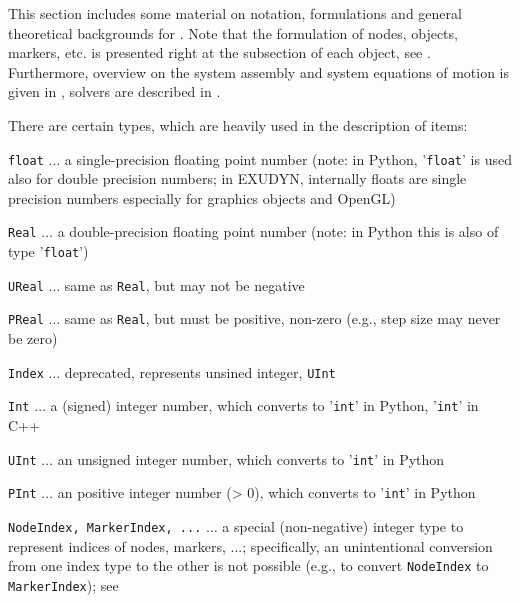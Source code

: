 

This section includes some material on notation, formulations and general theoretical backgrounds for \codeName .
Note that the formulation of nodes, objects, markers, etc. is presented right at the subsection of each object, see .
Furthermore, overview on the system assembly and system equations of motion is given in ,
solvers are described in .

\label{sec:itemnotation}
%
\label{sec:typesDescriptions}
%
There are certain types, which are heavily used in the description of items:
\bi
  \item \texttt{float} $\ldots$ a single-precision floating point number (note: in Python, '\texttt{float}' is used also for double precision numbers; in EXUDYN, internally floats are single precision numbers especially for graphics objects and OpenGL)
  \item \texttt{Real} $\ldots$ a double-precision floating point number (note: in Python this is also of type '\texttt{float}')
  \item \texttt{UReal} $\ldots$ same as \texttt{Real}, but may not be negative
  \item \texttt{PReal} $\ldots$ same as \texttt{Real}, but must be positive, non-zero (e.g., step size may never be zero)
  \item \texttt{Index} $\ldots$ deprecated, represents unsined integer, \texttt{UInt}
  \item \texttt{Int} $\ldots$ a (signed) integer number, which converts to '\texttt{int}' in Python, '\texttt{int}' in C++
  \item \texttt{UInt} $\ldots$ an unsigned integer number, which converts to '\texttt{int}' in Python
  \item \texttt{PInt} $\ldots$ an positive integer number (> 0), which converts to '\texttt{int}' in Python
  \item \texttt{NodeIndex, MarkerIndex, ...} $\ldots$ a special (non-negative) integer type to represent indices of nodes, markers, ...; specifically, an unintentional conversion from one index type to the other is not possible (e.g., to convert \texttt{NodeIndex} to \texttt{MarkerIndex}); see 
